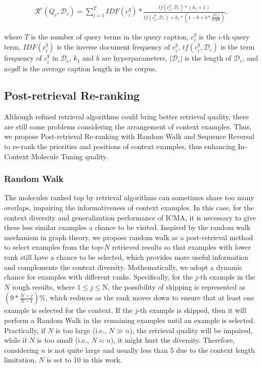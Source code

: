{\tiny
\begin{align}
    \mathcal{R}^c\!(\!Q_c\!,\!\mathcal{D}_c\!)\!=\!\sum_{i=1}^T\!I\!D\!F(\!c^q_i\!)\!*\!\frac{t\!f(c^q_i,\mathcal{D}_c)*(k_1+1)}{t\!f(\!c^q_i,\!\mathcal{D}_c\!)\!+\!k_1\!*\!(\!1\!-\!b\!+\!b\!*\!\frac{|\mathcal{D}_c|}{avgdl}\!)},
\end{align}
}

\noindent where $T$ is the number of query terms in the query caption, $c^q_i$ is the $i$-th query term, $I\!D\!F(c^q_i)$ is the inverse document frequency of $c^q_i$, $t\!f(c^q_i, \mathcal{D}_c)$ is the term frequency of $c^q_i$ in $\mathcal{D}_c$, $k_1$ and $b$ are hyperparameters, $|\mathcal{D}_c|$ is the length of $\mathcal{D}_c$, and $avgdl$ is the average caption length in the corpus.

\subsection{Post-retrieval Re-ranking}
Although refined retrieval algorithms could bring better retrieval quality, there are still some problems considering the arrangement of context examples. Thus, we propose Post-retrieval Re-ranking with Random Walk and Sequence Reversal to re-rank the priorities and positions of context examples, thus enhancing In-Context Molecule Tuning quality.

\subsubsection{Random Walk}
The molecules ranked top by retrieval algorithms can sometimes share too many overlaps, impairing the informativeness of context examples. 
In this case, for the context diversity and generalization performance of ICMA, it is necessary to give these less similar examples a chance to be visited.
Inspired by the random walk mechanism in graph theory, we propose random walk as a post-retrieval method to select examples from the top-$N$ retrieved results so that examples with lower rank still have a chance to be selected, which provides more useful information and complements the context diversity.
Mathematically, we adopt a dynamic chance for examples with different ranks. Specifically, for the $j$-th example in the $N$ rough results, where $1\leq j \leq $N, the possibility of skipping is represented as $(9*\frac{N-j}{N-1}) \%$, which reduces as the rank moves down to ensure that at least one example is selected for the context. 
If the $j$-th example is skipped, then it will perform a Random Walk in the remaining examples until an example is selected. Practically, if $N$ is too large (i.e., $N \gg n$), the retrieval quality will be impaired, while if $N$ is too small (i.e., $N \approx n$), it might hurt the diversity. Therefore, considering $n$ is not quite large and usually less than 5 due to the context length limitation, $N$ is set to 10 in this work.

